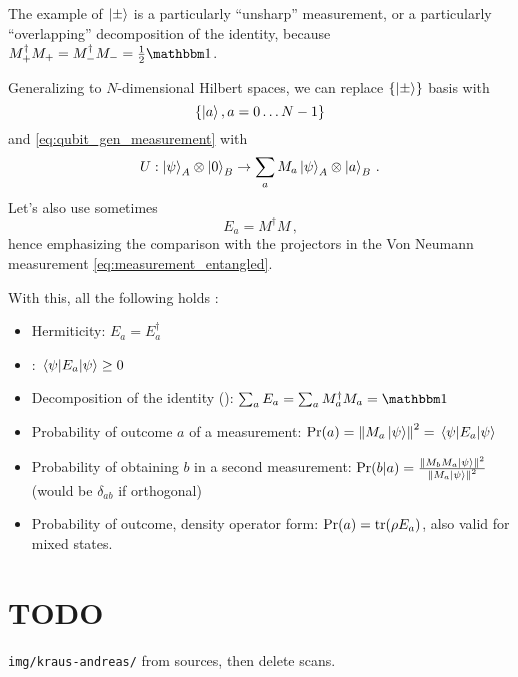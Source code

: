 The example of $\ket{\pm}$ is a particularly ``unsharp'' measurement,
or a particularly ``overlapping'' decomposition of the identity,
because $M_+^{\dagger}M_+ = M_-^{\dagger}M_- = \frac{1}{2}\idop$.

Generalizing to $N$-dimensional Hilbert spaces, we can replace
$\left\{\ket{\pm}\right\}$ basis with
\[
  \left\{\ket{a}, a = 0\ldots N-1\right\}
\]
and \eqref{eq:qubit_gen_measurement} with
\[
  U: \ket{\psi}_A \otimes \ket{0}_B \rightarrow \sum_a M_a\ket{\psi}_A \otimes \ket{a}_B
  \,\text{.}
\]
Let's also use sometimes
\[
  E_a = M^{\dagger}M \,\text{,}
\]
hence emphasizing the comparison with the projectors in the
Von Neumann measurement \eqref{eq:measurement_entangled}.

With this, all the following holds \parencite[Sec. 3.1]{PreskillNotes}:
\begin{itemize}
  \item 
    Hermiticity: $E_a = E_a^{\dagger}$
  \item
    : $\expval{E_a}{\psi} \geq 0$  
  \item
    Decomposition of the identity ():
    $\sum_a E_a = \sum_a M_a^{\dagger}M_a = \idop$
  \item
    Probability of outcome $a$ of a measurement:
    $\Pr(a) = \norm{M_a\ket{\psi}}^2 = \expval{E_a}{\psi}$
  \item
    Probability of obtaining $b$ in a second measurement:
    $\Pr(b|a) = \frac{\norm{M_bM_a\ket{\psi}}^2}{\norm{M_a\ket{\psi}}^2}$
    (would be $\delta_{ab}$ if orthogonal)
  \item
    Probability of outcome, density operator form:
    $\Pr(a) = \tr(\rho E_a)$,
    also valid for mixed states.
\end{itemize}

\iftodo
\section{TODO}
\texttt{img/kraus-andreas/} from sources,
then delete scans.
\fi
